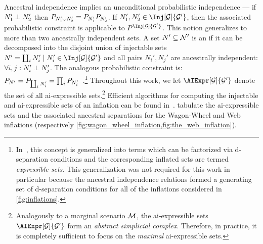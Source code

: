 \documentclass[aps, 10pt, english, twoside, pra, nofootinbib, tightenlines, longbibliography, superscriptaddress]{revtex4-1}
\begin{document}
    Ancestral independence implies an unconditional probabilistic independence --- if $N_1' \perp N_2'$ then $\prob[N_1' \cup N_2'] = \prob[N_1']\prob[N_2']$. If $N_1', N_2' \in \Inj[\graph]{\graph'}$, then the associated probabilistic constraint is applicable to $\prob^{\Inj[\graph]{\graph'}}$. This notion generalizes to more than two ancestrally independent sets. A set $N' \subseteq \mathcal{N}'$ is an  if it can be decomposed into the disjoint union of injectable sets $N' = \coprod_{i} N'_i \mid N'_i \in \Inj[\graph]{\graph'}$ and all pairs $N_i', N_j'$ are ancestrally independent: $\forall i, j : N_i' \perp N_j'$. The analogous probabilistic constraint is: $\prob[N'] = \prob[\coprod_i N'_i] = \prod_{i}\prob[N'_i]$~\cite{Pearl_2009}.\footnote{In~\cite{Inflation}, this concept is generalized into terms which can be factorized via d-separation conditions and the corresponding inflated sets are termed \textit{expressible sets}. This generalization was not required for this work in particular because the ancestral independence relations formed a generating set of d-separation conditions for all of the inflations considered in \cref{fig:inflations}.} Throughout this work, we let $\AIExpr[\graph]{\graph'}$ denote the set of all ai-expressible sets.\footnote{Analogously to a marginal scenario $\mathcal{M}$, the ai-expressible sets $\AIExpr[\graph]{\graph'}$ form an \textit{abstract simplicial complex}. Therefore, in practice, it is completely sufficient to focus on the \textit{maximal} ai-expressible sets.} Efficient algorithms for computing the injectable and ai-expressible sets of an inflation can be found in~\cite{Inflation}.  tabulate the ai-expressible sets and the associated ancestral separations for the Wagon-Wheel and Web inflations (respectively \cref{fig:wagon_wheel_inflation,fig:the_web_inflation}).
\end{document}
